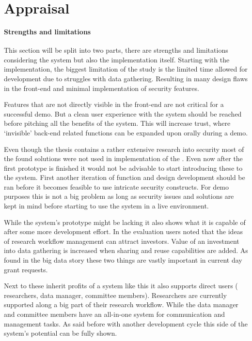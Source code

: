 \section{Appraisal}

\paragraph{Strengths and limitations}
This section will be split into two parts, there are strengths and limitations considering the system but also the implementation itself.
Starting with the implementation, the biggest limitation of the study is the limited time allowed for development due to struggles with data gathering.
Resulting in many design flaws in the front-end and minimal implementation of security features.

Features that are not directly visible in the front-end are not critical for a successful demo.
But a clean user experience with the system should be reached before pitching all the benefits of the system.
This will increase trust, where `invisible' back-end related functions can be expanded upon orally during a demo.

Even though the thesis contains a rather extensive research into security most of the found solutions were not used in implementation of the \ivfsystem{}.
Even now after the first prototype is finished it would not be advisable to start introducing these to the system.
First another iteration of function and design development should be ran before it becomes feasible to use intricate security constructs.
For demo purposes this is not a big problem as long as security issues and solutions are kept in mind before starting to use the system in a live environment.

While the system's prototype might be lacking it also shows what it is capable of after some more development effort.
In the evaluation users noted that the ideas of research workflow management can attract investors.
Value of an investment into data gathering is increased when sharing and reuse capabilities are added.
As found in the big data story these two things are vastly important in current day grant requests.

Next to these inherit profits of a system like this it also supports direct users (\ie{} researchers, data manager, committee members).
Researchers are currently supported along a big part of their research workflow.
While the data manager and committee members have an all-in-one system for communication and management tasks.
As said before with another development cycle this side of the system's potential can be fully shown.

